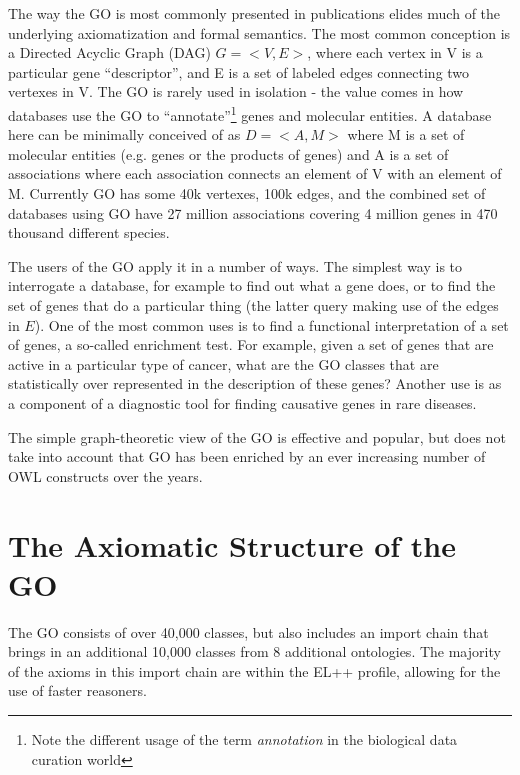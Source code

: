 \documentclass{llncs}
\begin{document}
The way the GO is most commonly presented in publications elides much
of the underlying axiomatization and formal semantics. The most common
conception is a Directed Acyclic Graph (DAG) $G = <V,E>$, where each
vertex in V is a particular gene ``descriptor'', and E is a set of
labeled edges connecting two vertexes in V. The GO is rarely used in
isolation - the value comes in how databases use the GO to
``annotate''\footnote{Note the different usage of the term
  \emph{annotation} in the biological data curation world} genes and
molecular entities.  A database here can be minimally conceived of as
$D = <A, M>$ where M is a set of molecular entities (e.g. genes or the
products of genes) and A is a set of associations where each
association connects an element of V with an element of M. Currently
GO has some 40k vertexes, 100k edges, and the combined set of
databases using GO have 27 million associations covering 4 million
genes in 470 thousand different species\cite{Blake2013}.

The users of the GO apply it in a number of ways. The simplest way is
to interrogate a database, for example to find out what a gene does,
or to find the set of genes that do a particular thing (the latter
query making use of the edges in $E$). One of the most common uses is
to find a functional interpretation of a set of genes, a so-called
enrichment test. For example, given a set of genes that are active in
a particular type of cancer, what are the GO classes that are
statistically over represented in the description of these
genes? Another use is as a component of a diagnostic tool for finding
causative genes in rare diseases\cite{Singleton2014}.

The simple graph-theoretic view of the GO is effective and popular,
but does not take into account that GO has been enriched by an ever
increasing number of OWL constructs over the years.

\section{The Axiomatic Structure of the GO}


The GO consists of over 40,000 classes, but also includes an import
chain that brings in an additional 10,000 classes from 8 additional
ontologies. The majority of the axioms in this import chain are within
the EL++ profile, allowing for the use of faster reasoners.
\end{document}

